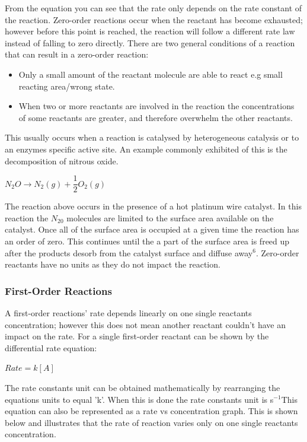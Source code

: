 From the equation you can see that the rate only depends on the rate constant of the reaction. Zero-order reactions occur when the reactant has become exhausted; however before this point is reached, the reaction will follow a different rate law instead of falling to zero directly. There are two general conditions of a reaction that can result in a zero-order reaction:

\begin{itemize}
\item Only a small amount of the reactant molecule are able to react e.g small reacting area/wrong state.
\item When two or more reactants are involved in the reaction the concentrations of some reactants are greater, and therefore overwhelm the other reactants.
\end{itemize}

This usually occurs when a reaction is catalysed by heterogeneous catalysis or to an enzymes specific active site. An example commonly exhibited of this is the decomposition of nitrous oxide.

$N_2O \rightarrow N_2(g) + \dfrac{1}{2} O_2(g)$

The reaction above occurs in the presence of a hot platinum wire catalyst. In this reaction the $N_20$ molecules are limited to the surface area available on the catalyst. Once all of the surface area is occupied at a given time the reaction has an order of zero. This continues until the a part of the surface area is freed up after the products desorb from the catalyst surface and diffuse away$^6$. Zero-order reactants have no units as they do not impact the reaction.



\subsubsection{First-Order Reactions}

A first-order reactions' rate depends linearly on one single reactants concentration; however this does not mean another reactant couldn't have an impact on the rate. For a single first-order reactant can be shown by the differential rate equation:

$Rate = k[A]$

The rate constants unit can be obtained mathematically by rearranging the equations units to equal 'k'. When this is done the rate constants unit is s$^{-1}$This equation can also be represented as a rate vs concentration graph. This is shown below and illustrates that the rate of reaction varies only on one single reactants concentration.


